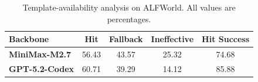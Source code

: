 \begin{table}[t]
\centering
\small
\setlength{\tabcolsep}{4pt}
\renewcommand{\arraystretch}{1.08}
\begin{tabular}{lcccc}
\toprule
\textbf{Backbone} & \textbf{Hit} & \textbf{Fallback} & \textbf{Ineffective} & \textbf{Hit Success} \\
\midrule
\textbf{MiniMax-M2.7} & 56.43 & 43.57 & 25.32 & 74.68 \\
\textbf{GPT-5.2-Codex} & 60.71 & 39.29 & 14.12 & 85.88 \\
\bottomrule
\end{tabular}
\caption{Template-availability analysis on ALFWorld. All values are percentages.}
\label{tab:template_availability}
\end{table}